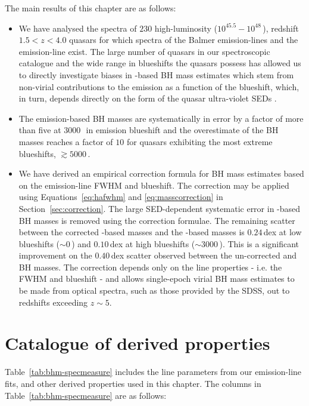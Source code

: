 The main results of this chapter are as follows: 

\begin{itemize}
\item We have analysed the spectra of $230$ high-luminosity ($10^{45.5}-10^{48}$\,\ergs), redshift $1.5 < z < 4.0$ quasars for which spectra of the Balmer emission-lines and the  emission-line exist.
The large number of quasars in our spectroscopic catalogue and the wide range in  blueshifts the quasars possess has allowed us to directly investigate biases in -based BH mass estimates which stem from non-virial contributions to the  emission as a function of the  blueshift, which, in turn, depends directly on the form of the quasar ultra-violet SEDs \citep{richards11}.
\item The  emission-based BH masses are systematically in error by a factor of more than five at $3000$\,\kms\, in  emission blueshift and the overestimate of the BH masses reaches a factor of $10$ for quasars exhibiting the most extreme blueshifts, $\gtrsim5000$\,\kms. 
\item We have derived an empirical correction formula for BH mass estimates based on the  emission-line FWHM and blueshift.
The correction may be applied using Equations~\ref{eq:hafwhm} and \ref{eq:masscorrection} in Section~\ref{sec:correction}.
The large SED-dependent systematic error in -based BH masses is removed using the correction formulae.
The remaining scatter between the corrected -based masses and the \hans-based masses is $0.24$\,dex at low  blueshifts ($\sim0$\,\kms) and $0.10$\,dex at high blueshifts ($\sim3000$\,\kms). 
This is a significant improvement on the $0.40$\,dex scatter observed between the un-corrected  and \ha BH masses. 
The correction depends only on the  line properties - i.e. the FWHM and blueshift - and allows single-epoch virial BH mass estimates to be made from optical spectra, such as those provided by the SDSS, out to redshifts exceeding $z\sim 5$. 
\end{itemize}

\section{Catalogue of derived properties}

Table~\ref{tab:bhm-specmeasure} includes the line parameters from our emission-line fits, and other derived properties used in this chapter. 
The columns in Table~\ref{tab:bhm-specmeasure} are as follows:

